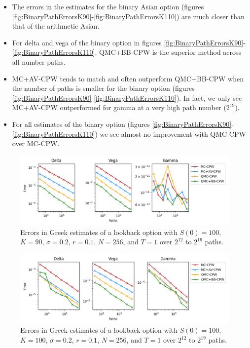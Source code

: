 \begin{itemize}
    \item The errors in the estimates for the binary Asian option (figures \ref{fig:BinaryPathErrorsK90}-\ref{fig:BinaryPathErrorsK110}) are much closer than that of the arithmetic Asian.
    \item For delta and vega of the binary option in figures \ref{fig:BinaryPathErrorsK90}-\ref{fig:BinaryPathErrorsK110}, QMC+BB-CPW is the superior method across all number paths.
    \item MC+AV-CPW tends to match and often outperform QMC+BB-CPW when the number of paths is smaller for the binary option (figures \ref{fig:BinaryPathErrorsK90}-\ref{fig:BinaryPathErrorsK110}). In fact, we only see MC+AV-CPW outperformed for gamma at a very high path number ($2^{19}$).
    \item For all estimates of the binary option (figures \ref{fig:BinaryPathErrorsK90}-\ref{fig:BinaryPathErrorsK110}) we see almost no improvement with QMC-CPW over MC-CPW.
\end{itemize}

\begin{figure}[H]
    \centering
    \includegraphics[width=1\textwidth]{figures/lookback path errors k=90.pdf}
    \caption{Errors in Greek estimates of a lookback option with $S(0)=100$, $K=90$, $\sigma = 0.2$, $r=0.1$, $N=256$, and $T=1$ over $2^{12}$ to $2^{19}$ paths.}
    \label{fig:LookbackPathErrorsK90}
\end{figure}

\begin{figure}[H]
    \centering
    \includegraphics[width=1\textwidth]{figures/lookback path errors k=100.pdf}
    \caption{Errors in Greek estimates of a lookback option with $S(0)=100$, $K=100$, $\sigma = 0.2$, $r=0.1$, $N=256$, and $T=1$ over $2^{12}$ to $2^{19}$ paths.}
    \label{fig:LookbackPathErrorsK100}
\end{figure}

